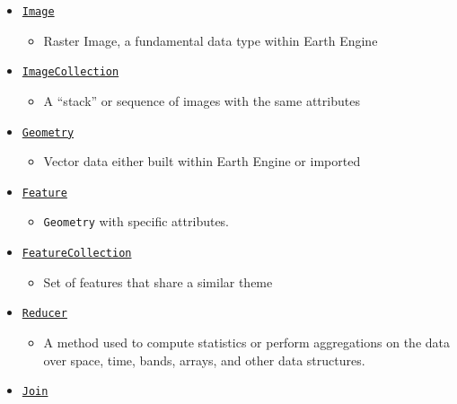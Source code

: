 \documentclass[
]{article}
\providecommand{\tightlist}{%
  \setlength{\itemsep}{0pt}\setlength{\parskip}{0pt}}
\begin{document}
\begin{itemize}
\tightlist
\item
  \href{https://developers.google.com/earth-engine/guides/image_overview}{\texttt{Image}}

  \begin{itemize}
  \tightlist
  \item
    Raster Image, a fundamental data type within Earth Engine
  \end{itemize}
\item
  \href{https://developers.google.com/earth-engine/guides/ic_creating}{\texttt{ImageCollection}}

  \begin{itemize}
  \tightlist
  \item
    A ``stack'' or sequence of images with the same attributes
  \end{itemize}
\item
  \href{https://developers.google.com/earth-engine/guides/geometries}{\texttt{Geometry}}

  \begin{itemize}
  \tightlist
  \item
    Vector data either built within Earth Engine or imported
  \end{itemize}
\item
  \href{https://developers.google.com/earth-engine/guides/features}{\texttt{Feature}}

  \begin{itemize}
  \tightlist
  \item
    \texttt{Geometry} with specific attributes.
  \end{itemize}
\item
  \href{https://developers.google.com/earth-engine/guides/feature_collections}{\texttt{FeatureCollection}}

  \begin{itemize}
  \tightlist
  \item
    Set of features that share a similar theme
  \end{itemize}
\item
  \href{https://developers.google.com/earth-engine/guides/reducers_intro}{\texttt{Reducer}}

  \begin{itemize}
  \tightlist
  \item
    A method used to compute statistics or perform aggregations on the data over space, time, bands, arrays, and other data structures.
  \end{itemize}
\item
  \href{https://developers.google.com/earth-engine/guides/joins_intro}{\texttt{Join}}


\end{itemize}
\end{document}
